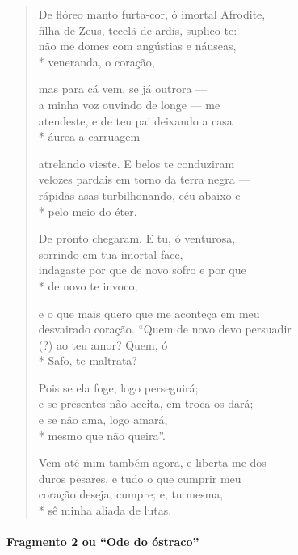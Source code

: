 \begin{verse}
De flóreo manto furta-cor, ó imortal Afrodite,\\
filha de Zeus, tecelã de ardis, suplico-te:\\
não me domes com angústias e náuseas,\\*
veneranda, o coração,

mas para cá vem, se já outrora ---\\
a minha voz ouvindo de longe --- me\\
atendeste, e de teu pai deixando a casa\\*
áurea a carruagem

atrelando vieste. E belos te conduziram\\
velozes pardais em torno da terra negra ---\\
rápidas asas turbilhonando, céu abaixo e\\*
pelo meio do éter.

De pronto chegaram. E tu, ó venturosa,\\
sorrindo em tua imortal face,\\
indagaste por que de novo sofro e por que\\*
de novo te invoco,

e o que mais quero que me aconteça em meu\\
desvairado coração. “Quem de novo devo persuadir\\
(?) ao teu amor? Quem, ó\\*
Safo, te maltrata?

Pois se ela foge, logo perseguirá;\\
e se presentes não aceita, em troca os dará;\\
e se não ama, logo amará,\\*
mesmo que não queira”.

Vem até mim também agora, e liberta-me dos\\
duros pesares, e tudo o que cumprir meu\\
coração deseja, cumpre; e, tu mesma,\\*
sê minha aliada de lutas.
\end{verse}

\paragraph{Fragmento 2 ou “Ode do óstraco”}

